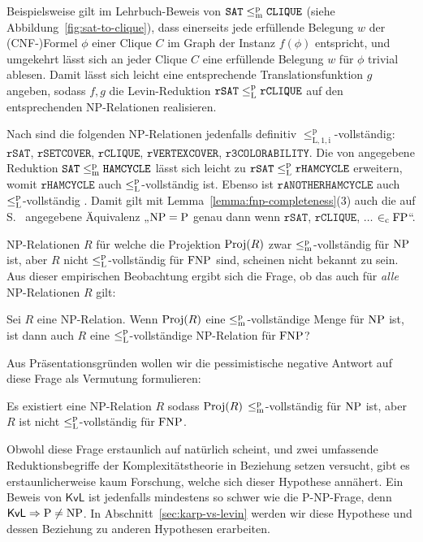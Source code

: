 Beispielsweise gilt im Lehrbuch-Beweis von $\mathtt{SAT}\leq_\mathrm{m}^\mathrm{p} \mathtt{CLIQUE}$ (siehe Abbildung~\ref{fig:sat-to-clique}), dass einerseits jede erfüllende Belegung $w$ der (CNF-)Formel $\phi$ einer Clique $C$ im Graph der Instanz $f(\phi)$ entspricht, und umgekehrt lässt sich an jeder Clique $C$ eine erfüllende Belegung $w$ für $\phi$ trivial ablesen. Damit lässt sich leicht eine entsprechende Translationsfunktion $g$ angeben, sodass $f,g$ die Levin-Reduktion $\mathtt{rSAT}\leq_\mathrm{L}^\mathrm{p}\mathtt{rCLIQUE}$ auf den entsprechenden NP-Relationen realisieren. 


Nach \textcite[104]{goldreich_computational_2008} sind die folgenden NP-Relationen jedenfalls definitiv $\leq_\mathrm{L,1,i}^\mathrm p$-vollständig: $\mathtt{rSAT}$, $\mathtt{rSETCOVER}$, $\mathtt{rCLIQUE}$, $\mathtt{rVERTEXCOVER}$, $\mathtt{r3COLORABILITY}$.
Die von \textcite[193-198]{papadimitriou_computational_1994} angegebene Reduktion $\mathtt{SAT}\leq_\mathrm{m}^\mathrm{p}\mathtt{HAMCYCLE}$ lässt sich leicht zu $\mathtt{rSAT}\leq_\mathrm{L}^\mathrm{p}\mathtt{rHAMCYCLE}$ erweitern, womit $\mathtt{rHAMCYCLE}$ auch $\leq_\mathrm{L}^\mathrm{p}$-vollständig ist.
Ebenso ist $\mathtt{rANOTHERHAMCYCLE}$ auch $\leq_\mathrm{L}^\mathrm{p}$-vollständig \parencite*[232]{papadimitriou_computational_1994}. Damit gilt mit Lemma~\ref{lemma:fnp-completeness}(3) auch die auf S.~\pageref{page:natural-searchproblems} angegebene Äquivalenz „$\mathrm{NP}=\mathrm{P}$ genau dann wenn $\mathtt{rSAT}$, $\mathtt{rCLIQUE}$, $\dots$ $\in_\mathrm{c} \mathrm{FP}$“.

NP-Relationen $R$ für welche die Projektion $\operatorname{Proj}(R)$ zwar $\leq_\mathrm{m}^\mathrm{p}$-vollständig für $\mathrm{NP}$ ist, aber $R$ nicht $\leq_\mathrm{L}^\mathrm{p}$-vollständig für $\mathrm{FNP}$ sind, scheinen nicht bekannt zu sein.
Aus dieser empirischen Beobachtung ergibt sich die Frage, ob das auch für \emph{alle} NP-Relationen $R$ gilt: 
\begin{question}\label{question:kvl}
Sei $R$ eine NP-Relation. Wenn $\operatorname{Proj}(R)$ eine $\leq_\mathrm{m}^\mathrm{p}$-vollständige Menge für $\mathrm{NP}$ ist, ist dann auch $R$ eine $\leq_\mathrm{L}^\mathrm{p}$-vollständige NP-Relation für $\mathrm{FNP}$?
\end{question}
Aus Präsentationsgründen wollen wir die pessimistische negative Antwort auf diese Frage als Vermutung formulieren:
\begin{conjecture}\label{conj:kvl}
    Es existiert eine NP-Relation $R$ sodass $\operatorname{Proj}(R)$ $\leq_\mathrm{m}^\mathrm{p}$-vollständig für $\mathrm{NP}$ ist, aber $R$ ist nicht $\leq_\mathrm{L}^\mathrm{p}$-vollständig für $\mathrm{FNP}$.
\end{conjecture}
Obwohl diese Frage erstaunlich auf natürlich scheint, und zwei umfassende Reduktionsbegriffe der Komplexitätstheorie in Beziehung setzen versucht, gibt es erstaunlicherweise kaum Forschung, welche sich dieser Hypothese annähert.
Ein Beweis von $\mathsf{KvL}$ ist jedenfalls mindestens so schwer wie die P-NP-Frage, denn $\mathsf{KvL}\Rightarrow \mathrm{P}\neq \mathrm{NP}$.
In Abschnitt~\ref{sec:karp-vs-levin} werden wir diese Hypothese und dessen Beziehung zu anderen Hypothesen erarbeiten. %

